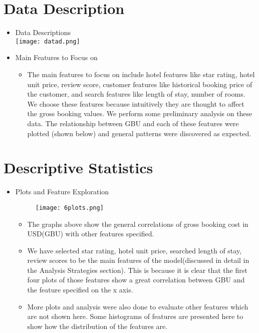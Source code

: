 \documentclass{article}
\begin{document}
\section{Data Description}
\begin{itemize}
    \item Data Descriptions\\
    \texttt{[image: datad.png]}
    \item Main Features to Focus on
    \begin{itemize}
        \item The main features to focus on include hotel features like star rating, hotel unit price, review score, customer features like historical booking price of the customer, and search features like length of stay, number of rooms. We choose these features because intuitively they are thought to affect the gross booking values. We perform some preliminary analysis on these data. The relationship between GBU and each of these features were plotted (shown below) and general patterns were discovered as expected. 
    \end{itemize}
\end{itemize}

\section{Descriptive Statistics}
\begin{itemize}
    \item Plots and  Feature Exploration
    \begin{figure}[ht]
        \centering
        \texttt{[image: 6plots.png]}
    \end{figure}
    \begin{itemize}
        \item The graphs above show the general correlations of gross booking cost in USD(GBU) with other features specified.
        \item We have selected star rating, hotel unit price, searched length of stay, review scores to be the main features of the model(discussed in detail in the Analysis Strategies section). This is because it is clear that the first four plots of those features show a great correlation between GBU and the feature specified on the x axis.
        \item More plots and analysis were also done to evaluate other features which are not shown here. Some histograms of features are presented here to show how the distribution of the features are.
    \end{itemize}
\end{itemize}
\end{document}
